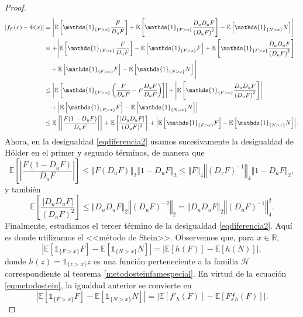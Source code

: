 \documentclass[letterpaper,twoside,12pt]{book}
\newcommand{\R}{\mathbb{R}}
\newcommand{\E}{\mathbb{E}}
\newcommand{\1}{\mathds{1}}
\newcommand{\abs}[1]{\left\lvert #1 \right\rvert}
\newcommand{\norm}[1]{\left\Vert #1 \right\Vert}
\theoremstyle{definition}
\theoremstyle{definition}
\theoremstyle{remark}
\theoremstyle{definition}
\theoremstyle{definition}
\theoremstyle{definition}
\theoremstyle{definition}
\theoremstyle{definition}
\begin{document}
\begin{proof}
\begin{align}\label{eqdiferencia2}
   \abs{f_F(x)-\Phi(x)}&=\abs{\E\left[\1_{\{F>x\}}\frac{F}{D_{u}F}\right]+\E\left[\1_{\{F>x\}}\frac{D_uD_uF}{\left(D_{u}F\right)^2}\right]-\E\left[\1_{\{N>x\}}N\right]}\notag\\
   &=+\Bigg|\E\left[\1_{\{F>x\}}\frac{F}{D_{u}F}\right]-\E\left[\1_{\{F>x\}}F\right]+\E\left[\1_{\{F>x\}}\frac{D_uD_uF}{\left(D_{u}F\right)^2}\right]\notag\\
   &\ \ \ +\E\left[\1_{\{F>x\}}F\right]-\E\left[\1_{\{N>x\}}N\right]\Bigg|\notag\\
   &\leq \abs{\E\left[\1_{\{F>x\}}\left(\frac{F}{D_uF}-F\frac{D_uF}{D_uF}\right)\right]}+\abs{\E\left[\1_{\{F>x\}}\frac{D_uD_uF}{\left(D_{u}F\right)^2}\right]}\notag\\
   &\ \ \ +\abs{\E\left[\1_{\{F>x\}}F\right]-\E\left[\1_{\{N>x\}}N\right]}\notag\\
   &\leq \E\left[\abs{\frac{F(1-D_uF)}{D_uF}}\right]+\E\left[\frac{\abs{D_uD_uF}}{(D_uF)^2}\right]+\abs{\E\left[\1_{\{F>x\}}F\right]-\E\left[\1_{\{N>x\}}N\right]}.
\end{align}
Ahora, en la desigualdad \eqref{eqdiferencia2} usamos sucesivamente la desigualdad de Hölder en el primer y segundo términos, de manera que
\begin{equation}\label{eqdiferencia3}
   \E\left[\abs{\frac{F(1-D_uF)}{D_uF}}\right]\leq \norm{F(D_uF)}_2\norm{1-D_uF}_2\leq \norm{F}_4\norm{(D_vF)^{-1}}_4\norm{1-D_uF}_2,
\end{equation}
y también
\begin{equation}\label{eqdiferencia4}
   \E\left[\frac{\abs{D_uD_uF}}{(D_uF)^2}\right]\leq \norm{D_uD_uF}_2\norm{(D_uF)^{-2}}_2=\norm{D_uD_uF}_2\norm{(D_uF)^{-1}}_4^{2}.
\end{equation}
Finalmente, estudiamos el tercer término de la desigualdad \eqref{eqdiferencia2}. Aquí es donde utilizamos el <<método de Stein>>. Observemos que, para $x\in \R$,
\[
   \abs{\E\left[\1_{\{F>x\}}F\right]-\E\left[\1_{\{N>x\}}N\right]}=\abs{\E\left[h(F)\right]-\E\left[h(N)\right]},
\]
donde $h(z)=\1_{\{z>x\}}z$ es una función perteneciente a la familia $\mathscr{H}$ correspondiente al teorema \ref{metodosteinfamespecial}. En virtud de la ecuación \eqref{eqmetodostein}, la igualdad anterior se convierte en
\begin{equation}\label{eqdiferencia5}
   \abs{\E\left[\1_{\{F>x\}}F\right]-\E\left[\1_{\{N>x\}}N\right]}=\abs{\E\left[f'_h(F)\right]-\E\left[Ff_h(F)\right]}.
\end{equation}

\end{proof}
\end{document}

